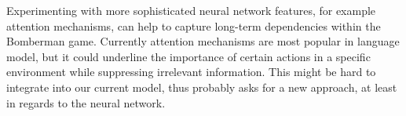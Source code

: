Experimenting with more sophisticated neural network features, for example attention mechanisms, can help to capture long-term dependencies within the Bomberman game. Currently attention mechanisms are most popular in language model, but it could underline the importance of certain actions in a specific environment while suppressing irrelevant information. This might be hard to integrate into our current model, thus probably asks for a new approach, at least in regards to the neural network.



